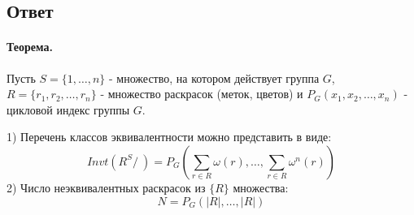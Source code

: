\documentclass{report}
\begin{document}
\subsection{Ответ}
\paragraph*{Теорема.}
Пусть $S = \{1, \ldots, n\}$ - множество, на котором действует группа $G$,
$R = \{r_1,r_2,\ldots, r_{n}\}$ - множество раскрасок (меток, цветов) и
$P_G(x_1,x_2,\ldots,x_{n})$ - цикловой индекс группы $G$.

\medskip

1) Перечень классов эквивалентности можно представить в виде:
\[
Invt(R^{S}/~) = P_G(\sum\limits_{r \in R}\omega(r), \ldots, \sum\limits_{r \in R}\omega^{n}(r))
\]
2) Число неэквивалентных раскрасок из $\{R\}$ множества:
\[
N = P_G(|R|, \ldots, |R|)
\] 
\end{document}
